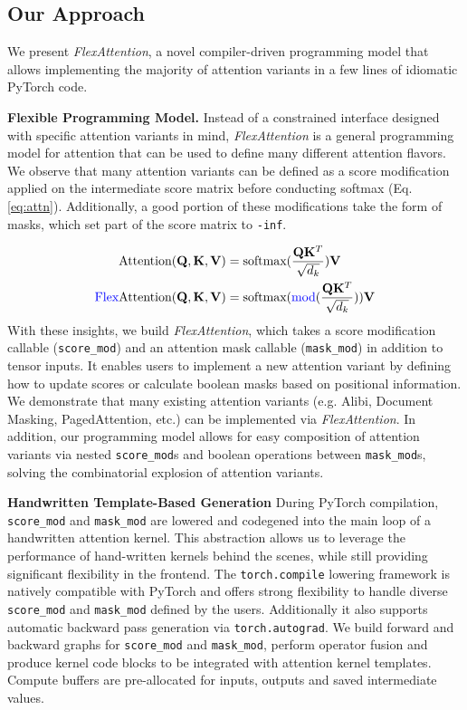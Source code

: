  
\subsection{Our Approach}
We present \textit{FlexAttention}, a novel compiler-driven programming model that allows implementing the majority of attention variants in a few lines of idiomatic PyTorch code. 

\textbf{Flexible Programming Model. } Instead of a constrained interface designed with specific attention variants in mind, \textit{FlexAttention} is a general programming model for attention that can be used to define many different attention flavors.
We observe that many attention variants can be defined as a score modification applied on the intermediate score matrix before conducting softmax (Eq. \ref{eq:attn}). Additionally, a good portion of these modifications take the form of masks, which set part of the score matrix to {\tt -inf}. 

{\small
\begin{align}
    \text{Attention}(\mathbf{Q}, \mathbf{K}, \mathbf{V}) &= \text{softmax}(\frac{\mathbf{Q}\mathbf{K}^T}{\sqrt{d_k}})\mathbf{V} \nonumber \\ 
    \text{\textcolor{blue}{Flex}Attention}(\mathbf{Q}, \mathbf{K}, \mathbf{V}) &= \text{softmax}(\text{\textcolor{blue}{mod}}(\frac{\mathbf{Q}\mathbf{K}^T}{\sqrt{d_k}}))\mathbf{V} 
\label{eq:attn}
\end{align}
}%
With these insights, we build \textit{FlexAttention}, which takes a score modification callable ({\tt score\_mod}) and an attention mask callable ({\tt mask\_mod}) in addition to tensor inputs. It enables users to implement a new attention variant by defining how to update scores or calculate boolean masks based on positional information. We demonstrate that many existing attention variants (e.g. Alibi, Document Masking, PagedAttention, etc.) can be implemented via \textit{FlexAttention}. In addition, our programming model allows for easy composition of attention variants via nested {\tt score\_mod}s and boolean operations between {\tt mask\_mod}s, solving the combinatorial explosion 
of attention variants. 

\textbf{Handwritten Template-Based Generation}
During PyTorch compilation, {\tt score\_mod} and {\tt mask\_mod} are lowered and codegened into the main loop of a handwritten attention kernel. This abstraction allows us to leverage the performance of hand-written kernels behind the scenes, while still providing significant flexibility in the frontend.
The {\tt torch.compile} lowering framework is natively compatible with PyTorch and offers strong flexibility to handle diverse {\tt score\_mod} and {\tt mask\_mod} defined by the users. Additionally it also supports automatic backward pass generation via {\tt torch.autograd}. 
We build forward and backward graphs for {\tt score\_mod} and {\tt mask\_mod}, perform operator fusion and produce kernel code blocks to be integrated with attention kernel templates. Compute buffers are pre-allocated for inputs, outputs and saved intermediate values. 


